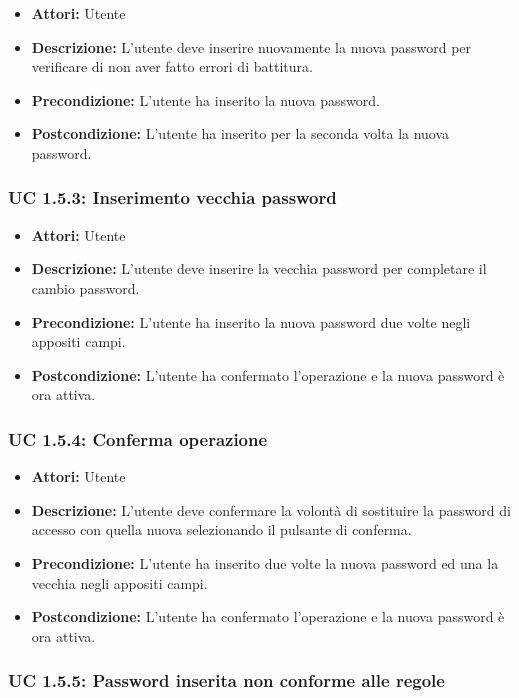 \begin{itemize}
    \item \textbf{Attori:} Utente
    \item \textbf{Descrizione:} L'utente deve inserire nuovamente la nuova password per verificare di non aver fatto errori di battitura.
    \item \textbf{Precondizione:} L'utente ha inserito la nuova password.
    \item \textbf{Postcondizione:} L'utente ha inserito per la seconda volta la nuova password.
\end{itemize}

\subsubsection{UC 1.5.3: Inserimento vecchia password}

\begin{itemize}
    \item \textbf{Attori:} Utente
    \item \textbf{Descrizione:} L'utente deve inserire la vecchia password per completare il cambio password.
    \item \textbf{Precondizione:} L'utente ha inserito la nuova password due volte negli appositi campi.
    \item \textbf{Postcondizione:} L'utente ha confermato l'operazione e la nuova password è ora attiva.
\end{itemize}

\subsubsection{UC 1.5.4: Conferma operazione}

\begin{itemize}
    \item \textbf{Attori:} Utente
    \item \textbf{Descrizione:} L'utente deve confermare la volontà di sostituire la password di accesso con quella nuova selezionando il pulsante di conferma.
    \item \textbf{Precondizione:} L'utente ha inserito due volte la nuova password ed una la vecchia negli appositi campi.
    \item \textbf{Postcondizione:} L'utente ha confermato l'operazione e la nuova password è ora attiva.
\end{itemize}

\subsubsection{UC 1.5.5: Password inserita non conforme alle regole}

